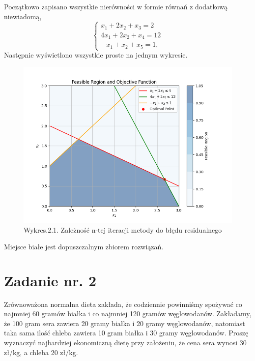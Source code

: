 \documentclass{article}
\begin{document}
Początkowo zapisano wszystkie nierówności w formie równań z dodatkową niewiadomą,
\begin{equation}
    \begin{cases}
      x_{1}+2x_{2}+x_3 = 2 \\
     4x_{1} + 2x_{2}+x_4 = 12\\
     -x_1 + x_2 + x_5 = 1, 
    \end{cases}
  \end{equation}
Następnie wyświetlono wszystkie proste na jednym wykresie.\newpage
\begin{figure}[h]
    \includegraphics[scale=0.5]{Simplex1.png}
    \centering
    \captionsetup[Tabela]{name=New Table Name}
    \caption*{Wykres.2.1. Zależność n-tej iteracji metody do błędu residualnego}
  \end{figure}
  Miejsce białe jest dopuszczalnym zbiorem rozwiązań. \newline
  
\section{Zadanie nr. 2}
Zrównoważona normalna dieta zakłada, że codziennie powinniśmy spożywać co 
najmniej 60 gramów białka i co najmniej 120 gramów węglowodanów. Zakładamy, że 100 
gram sera zawiera 20 gramy białka i 20 gramy węglowodanów, natomiast taka sama ilość 
chleba zawiera 10 gram białka i 30 gramy węglowodanów. Proszę wyznaczyć najbardziej 
ekonomiczną dietę przy założeniu, że cena sera wynosi 30 zł/kg, a chleba 20 zł/kg.\\
\end{document}
